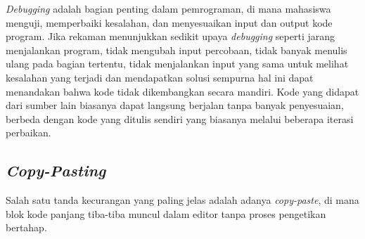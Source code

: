 \textit{Debugging} adalah bagian penting dalam pemrograman, di mana mahasiswa menguji, memperbaiki kesalahan, dan menyesuaikan input dan output kode program. Jika rekaman menunjukkan sedikit upaya \textit{debugging} seperti jarang menjalankan program, tidak mengubah input percobaan, tidak banyak menulis ulang pada bagian tertentu, tidak menjalankan input yang sama untuk melihat kesalahan yang terjadi dan mendapatkan solusi sempurna hal ini dapat menandakan bahwa kode tidak dikembangkan secara mandiri. Kode yang didapat dari sumber lain biasanya dapat langsung berjalan tanpa banyak penyesuaian, berbeda dengan kode yang ditulis sendiri yang biasanya melalui beberapa iterasi perbaikan.

\subsection{\textit{Copy-Pasting}}

Salah satu tanda kecurangan yang paling jelas adalah adanya \textit{copy-paste}, di mana blok kode panjang tiba-tiba muncul dalam editor tanpa proses pengetikan bertahap.